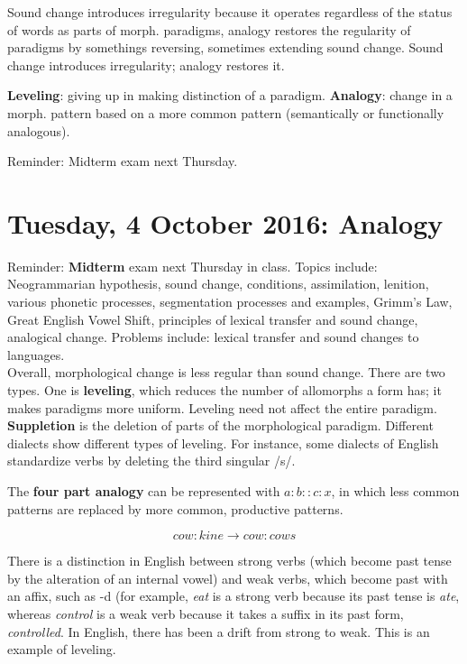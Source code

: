 \documentclass{exam}
\begin{document}
Sound change introduces irregularity because it operates regardless of the status of words as parts of morph. paradigms, analogy restores the regularity of paradigms by somethings reversing, sometimes extending sound change. Sound change introduces irregularity; analogy restores it. 


\textbf{Leveling}: giving up in making distinction of a paradigm. \textbf{Analogy}: change in a morph. pattern based on a more common pattern (semantically or functionally analogous). 

Reminder: Midterm exam next Thursday. 

\section*{Tuesday, 4 October 2016: Analogy}

Reminder: \textbf{Midterm} exam next Thursday in class. Topics include: Neogrammarian hypothesis, sound change, conditions, assimilation, lenition, various phonetic processes, segmentation processes and examples, Grimm's Law, Great English Vowel Shift, principles of lexical transfer and sound change, analogical change. Problems include: lexical transfer and sound changes to languages.\\

Overall, morphological change is less regular than sound change. There are two types. One is \textbf{leveling}, which reduces the number of allomorphs a form has; it makes paradigms more uniform. Leveling need not affect the entire paradigm. \textbf{Suppletion} is the deletion of parts of the morphological paradigm. Different dialects show different types of leveling. For instance, some dialects of English standardize verbs by deleting the third singular /s/. 

The \textbf{four part analogy} can be represented with $a:b::c:x$, in which less common patterns are replaced by more common, productive patterns. 

$$cow:kine \rightarrow cow:cows$$

There is a distinction in English between strong verbs (which become past tense by the alteration of an internal vowel) and weak verbs, which become past with an affix, such as -d (for example, \textit{eat} is a strong verb because its past tense is \textit{ate}, whereas \textit{control} is a weak verb because it takes a suffix in its past form, \textit{controlled}. In English, there has been a drift from strong to weak. This is an example of leveling. 
\end{document}

